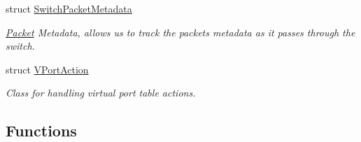 \begin{DoxyCompactItemize}
struct \hyperlink{structns3_1_1ofi_1_1SwitchPacketMetadata}{Switch\+Packet\+Metadata}
\begin{DoxyCompactList}\small\item\em \hyperlink{classns3_1_1Packet}{Packet} Metadata, allows us to track the packet\textquotesingle{}s metadata as it passes through the switch. \end{DoxyCompactList}\item 
struct \hyperlink{structns3_1_1ofi_1_1VPortAction}{V\+Port\+Action}
\begin{DoxyCompactList}\small\item\em Class for handling virtual port table actions. \end{DoxyCompactList}\end{DoxyCompactItemize}
\subsection*{Functions}
